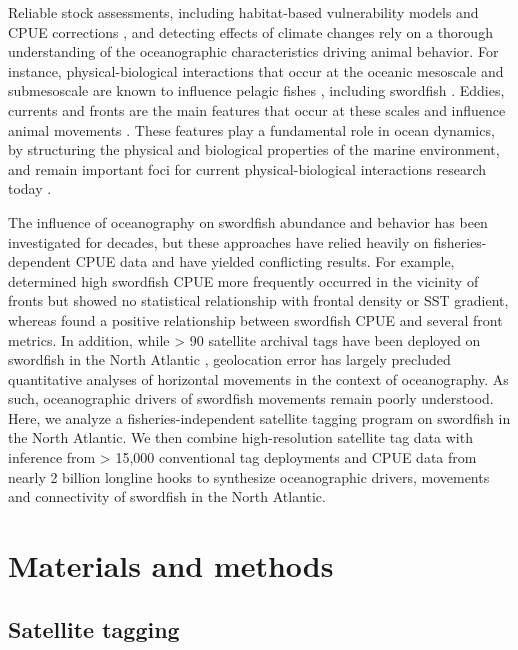 Reliable stock assessments, including habitat-based vulnerability models and CPUE corrections \citep{Hinton1996, Bigelow2007}, and detecting effects of climate changes \citep{Schirripa2016} rely on a thorough understanding of the oceanographic characteristics driving animal behavior. For instance, physical-biological interactions that occur at the oceanic mesoscale \citep[$\mathcal{O}$(10-100 km);][]{McGillicuddy2016} and submesoscale \citep[$\mathcal{O}$(1 km); ][]{flierl2002mesoscale, levy2012bringing} are known to influence pelagic fishes \citep{teo2010comparative, Seki2002, godo2012mesoscale}, including swordfish \citep{Podesta1993, Scales2017}. Eddies, currents and fronts are the main features that occur at these scales and influence animal movements \citep{Hobday2014}. These features play a fundamental role in ocean dynamics, by structuring the physical and biological properties of the marine environment, and remain important foci for current physical-biological interactions research today \citep{McGillicuddy2016}.

The influence of oceanography on swordfish abundance and behavior has been investigated for decades, but these approaches have relied heavily on fisheries-dependent CPUE data and have yielded conflicting results. For example, \citet{Podesta1993} determined high swordfish CPUE more frequently occurred in the vicinity of fronts but showed no statistical relationship with frontal density or SST gradient, whereas \citet{Bigelow1999} found a positive relationship between swordfish CPUE and several front metrics. In addition, while > 90 satellite archival tags have been deployed on swordfish in the North Atlantic \citep{Braun2015}, geolocation error has largely precluded quantitative analyses of horizontal movements in the context of oceanography. As such, oceanographic drivers of swordfish movements remain poorly understood. Here, we analyze a fisheries-independent satellite tagging program on swordfish in the North Atlantic. We then combine high-resolution satellite tag data with inference from > 15,000 conventional tag deployments and CPUE data from nearly 2 billion longline hooks to synthesize oceanographic drivers, movements and connectivity of swordfish in the North Atlantic.

\section{Materials and methods}

\subsection{Satellite tagging}\label{sat-tag-methods}

